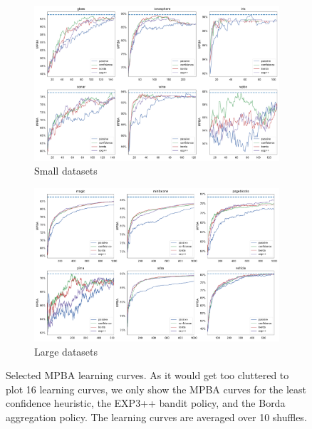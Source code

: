 \documentclass[fleqn,10pt,lineno]{wlpeerj} %
\begin{document}
\begin{figure}[tbp]
	\centering
	\begin{subfigure}[t]{\textwidth}
        \centering
        \includegraphics[width=\textwidth]{figures/learning_curves-mpba-small}
        \caption{Small datasets}
	\end{subfigure}
	\begin{subfigure}[t]{\textwidth}
        \centering
        \includegraphics[width=\textwidth]{figures/learning_curves-mpba-large}
        \caption{Large datasets}
    \end{subfigure}
	\caption[Selected learning curves]{Selected MPBA learning curves.
	As it would get too cluttered to plot 16 learning curves, we only show the
	MPBA curves for the least confidence heuristic, the EXP3++ bandit policy,
	and the Borda aggregation policy. The learning curves are averaged over 10
	shuffles.}
	\label{fig:learning_curves-mpba}
\end{figure}
\end{document}
